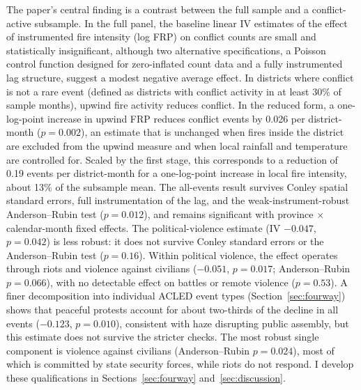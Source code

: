 \documentclass[12pt]{article}
\begin{document}
The paper's central finding is a contrast between the full sample and a conflict-active subsample. In the full panel, the baseline linear IV estimates of the effect of instrumented fire intensity (log FRP) on conflict counts are small and statistically insignificant, although two alternative specifications, a Poisson control function designed for zero-inflated count data \citep[following][]{lu2023fish} and a fully instrumented lag structure, suggest a modest negative average effect. In districts where conflict is not a rare event (defined as districts with conflict activity in at least 30\% of sample months), upwind fire activity reduces conflict. In the reduced form, a one-log-point increase in upwind FRP reduces conflict events by 0.026 per district-month ($p=0.002$), an estimate that is unchanged when fires inside the district are excluded from the upwind measure and when local rainfall and temperature are controlled for. Scaled by the first stage, this corresponds to a reduction of 0.19 events per district-month for a one-log-point increase in local fire intensity, about 13\% of the subsample mean. The all-events result survives Conley spatial standard errors, full instrumentation of the lag, and the weak-instrument-robust Anderson--Rubin test ($p=0.012$), and remains significant with province $\times$ calendar-month fixed effects. The political-violence estimate (IV $-0.047$, $p=0.042$) is less robust: it does not survive Conley standard errors or the Anderson--Rubin test ($p=0.16$). Within political violence, the effect operates through riots and violence against civilians ($-0.051$, $p=0.017$; Anderson--Rubin $p=0.066$), with no detectable effect on battles or remote violence ($p=0.53$). A finer decomposition into individual ACLED event types (Section~\ref{sec:fourway}) shows that peaceful protests account for about two-thirds of the decline in all events ($-0.123$, $p=0.010$), consistent with haze disrupting public assembly, but this estimate does not survive the stricter checks. The most robust single component is violence against civilians (Anderson--Rubin $p=0.024$), most of which is committed by state security forces, while riots do not respond. I develop these qualifications in Sections~\ref{sec:fourway} and~\ref{sec:discussion}.
\end{document}
